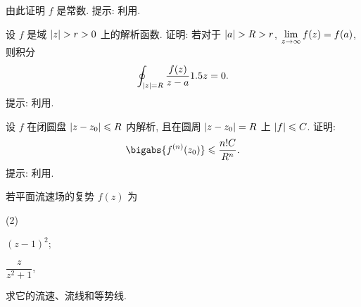 \begin{homework}
\begin{homework}
    由此证明 $f$ 是常数.
    提示: 利用\thmGrowUp.
    \item 设 $f$ 是域 $\abs{z}>r>0$ 上的解析函数.
    证明: 若对于 $\abs{a}>R>r$, $\displaystyle\lim_{z\rightarrow\infty} f(z)=f(a)$, 则积分
    \[
      \oint_{\left|z\right|=R} \frac{f(z)}{z-a}1.5 z=0.
    \]
    提示: 利用\thmGrowUp.
    \item 设 $f$ 在闭圆盘 $\left|z-z_0\right|\leqslant R$ 内解析, 且在圆周 $\left|z-z_0\right|=R$ 上 $\left|f\right|\leqslant C$. 证明:
    \[
      \bigabs{f^{(n)}(z_0)}\le \frac{n!C}{R^n}.
    \]
    提示: 利用\thmGrowUp.
    \item \optionalex 若平面流速场的复势 $f(z)$ 为
    \begin{subhomework}(2)
      \item $(z-1)^2$;
      \item $\dfrac{z}{z^2+1}$,
    \end{subhomework}
    求它的流速、流线和等势线.
  \end{homework}
\end{homework}
